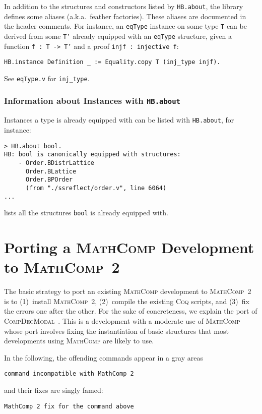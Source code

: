 \documentclass{article}
\def\coq{\textsc{Coq}}
\def\mathcomp{\textsc{MathComp}}
\def\mathcomptwo{\mathcomp~2}
\def\compdecmodal{\textsc{CompDecModal}}
\def\coqin#1{\texttt{#1}}
\begin{document}
In addition to the structures and constructors listed by \coqin{HB.about}, the
library defines some aliases (a.k.a.\ feather factories). These aliases
are documented in the header comments. For instance, an \coqin{eqType}
instance on some type \coqin{T} can be derived from some \coqin{T'} already
equipped with an \coqin{eqType} structure, given a function \coqin{f : T -> T'}
and a proof \coqin{injf : injective f}:
\begin{verbatim}
HB.instance Definition _ := Equality.copy T (inj_type injf).
\end{verbatim}
See \coqin{eqType.v} for \coqin{inj_type}.

\subsubsection{Information about Instances with \coqin{HB.about}}

Instances a type is already equipped with can be listed with
\coqin{HB.about}, for instance:
\begin{verbatim}
> HB.about bool.
HB: bool is canonically equipped with structures:
    - Order.BDistrLattice
      Order.BLattice
      Order.BPOrder
      (from "./ssreflect/order.v", line 6064)
...
\end{verbatim}
lists all the structures \coqin{bool} is already equipped with.

\section{Porting a \mathcomp{} Development to \mathcomptwo}
\label{sec:compdecmodal}

The basic strategy to port an existing \mathcomp{} development to
\mathcomptwo{} is to (1)~install \mathcomptwo, (2)~compile the existing \coq{}
scripts, and (3)~fix the errors one after the other.
%
For the sake of concreteness, we explain the port of
\compdecmodal~\cite{compdecmodal}. This is a development with a
moderate use of \mathcomp{} whose port involves fixing the
instantiation of basic structures that most developments using
\mathcomp{} are likely to use.

In the following, the offending commands appear in a gray areas
\begin{verbatim}
command incompatible with MathComp 2
\end{verbatim}
and their fixes are singly famed:
\begin{verbatim}
MathComp 2 fix for the command above
\end{verbatim}
\end{document}
